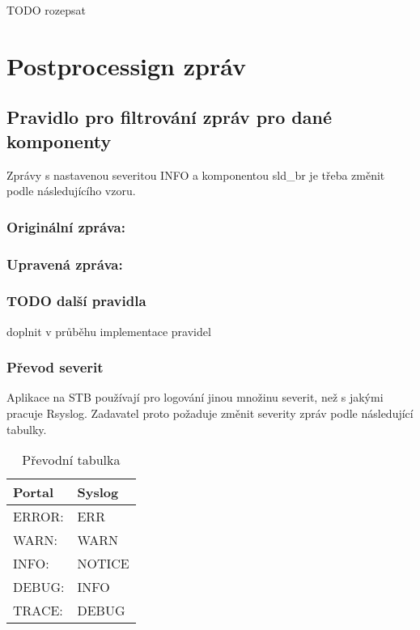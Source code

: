 \documentclass[thesis=B,czech]{FITthesis}[2012/06/26]
\begin{document}
TODO rozepsat

\section{Postprocessign zpráv}

\subsection{Pravidlo pro filtrování zpráv pro dané komponenty}
Zprávy s nastavenou severitou INFO a komponentou sld\_br je třeba změnit podle následujícího vzoru.

\subsubsection*{Originální zpráva:}
\begin{scriptsize}
\begin{verbatim}
2016-02-18T14:05:24+01:00 cc-b8-f1-00-6f-07 sld_br: id=559 
:[stbhal.cpp:debug:520]: INFO: [94mDEBUG: InformationService:
 Reading 'nangu.video.forcedScart': false[0m
\end{verbatim}}
\end{scriptsize}

\subsubsection*{Upravená zpráva:}
\begin{scriptsize}
\begin{verbatim}
2016-02-18T14:05:24+01:00 cc-b8-f1-00-6f-07 nangu-portal: [94m InformationService:
 Reading 'nangu.video.forcedScart': false[0m
\end{verbatim}}
\end{scriptsize}

\subsubsection{TODO další pravidla}
doplnit v průběhu implementace pravidel

\subsubsection{Převod severit}
Aplikace na STB používají pro logování jinou množinu severit, než s jakými pracuje Rsyslog. Zadavatel proto požaduje změnit severity zpráv podle následující tabulky.

\begin{table}[ht]
\centering
	\caption{Převodní tabulka}	\begin{tabular}{|l|l|}\hline
		Portal		& Syslog			\tabularnewline \hline \hline
		ERROR:		& ERR			\tabularnewline \hline
		WARN:		& WARN			\tabularnewline \hline
		INFO:		& NOTICE			\tabularnewline \hline
		DEBUG:		& INFO			\tabularnewline \hline
		TRACE:		& DEBUG			\tabularnewline \hline
	\end{tabular}
\end{table}
\end{document}
